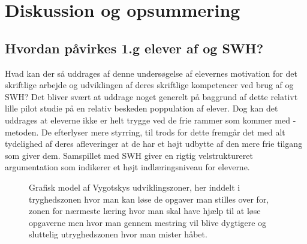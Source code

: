 \chapter{Diskussion og opsummering}
\label{Ch:5}

\section{Hvordan påvirkes 1.g elever af \ib{} og SWH?}
\label{sec:ibseswh}
Hvad kan der så uddrages af denne undersøgelse af elevernes motivation for det skriftlige arbejde og udviklingen af deres skriftlige kompetencer ved brug af \ib{} og SWH? Det bliver svært at uddrage noget generelt på baggrund af dette relativt lille pilot studie på en relativ beskeden poppulation af elever. Dog kan det uddrages at eleverne ikke er helt trygge ved de frie rammer som kommer med \ib{}-metoden. De efterlyser mere styrring, til trods for dette fremgår det med alt tydelighed af deres afleveringer at de har et højt udbytte af den mere frie tilgang som \ib{} giver dem. Samspillet med SWH giver en rigtig velstruktureret argumentation som indikerer et højt indlæringsniveau for eleverne. 

\begin{figure}[h!]
	\centering
	\usetikzlibrary{decorations.text}
	\caption[Vygotskys udviklingszoner]{Grafisk model af Vygotskys udviklingszoner, her inddelt i tryghedszonen hvor man kan løse de opgaver man stilles over for, zonen for nærmeste læring hvor man skal have hjælp til at løse opgaverne men hvor man gennem mestring vil blive dygtigere og sluttelig utryghedszonen hvor man mister håbet. }
	\label{fig:vyg}
\end{figure}

